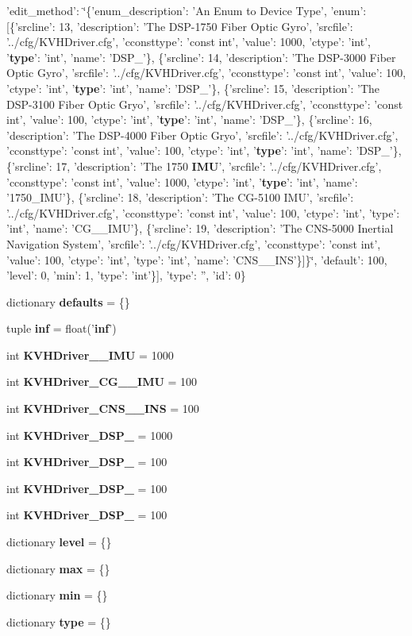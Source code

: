 \begin{DoxyCompactItemize}
'edit\-\_\-method'\-: \char`\"{}\{'enum\-\_\-description'\-: '\-An \-Enum to \-Device \-Type', 'enum'\-: [\{'srcline'\-: 13, 'description'\-: '\-The \-D\-S\-P-\/1750 \-Fiber \-Optic \-Gyro', 'srcfile'\-: '../cfg/\-K\-V\-H\-Driver.\-cfg', 'cconsttype'\-: 'const int', 'value'\-: 1000, 'ctype'\-: 'int', '{\bf type}'\-: 'int', 'name'\-: '\-D\-S\-P\-\_'\}, \{'srcline'\-: 14, 'description'\-: '\-The \-D\-S\-P-\/3000 \-Fiber \-Optic \-Gyro', 'srcfile'\-: '../cfg/\-K\-V\-H\-Driver.\-cfg', 'cconsttype'\-: 'const int', 'value'\-: 100, 'ctype'\-: 'int', '{\bf type}'\-: 'int', 'name'\-: '\-D\-S\-P\-\_'\}, \{'srcline'\-: 15, 'description'\-: '\-The \-D\-S\-P-\/3100 \-Fiber \-Optic \-Gryo', 'srcfile'\-: '../cfg/\-K\-V\-H\-Driver.\-cfg', 'cconsttype'\-: 'const int', 'value'\-: 100, 'ctype'\-: 'int', '{\bf type}'\-: 'int', 'name'\-: '\-D\-S\-P\-\_'\}, \{'srcline'\-: 16, 'description'\-: '\-The \-D\-S\-P-\/4000 \-Fiber \-Optic \-Gryo', 'srcfile'\-: '../cfg/\-K\-V\-H\-Driver.\-cfg', 'cconsttype'\-: 'const int', 'value'\-: 100, 'ctype'\-: 'int', '{\bf type}'\-: 'int', 'name'\-: '\-D\-S\-P\-\_'\}, \{'srcline'\-: 17, 'description'\-: '\-The 1750 {\bf \-I\-M\-U}', 'srcfile'\-: '../cfg/\-K\-V\-H\-Driver.\-cfg', 'cconsttype'\-: 'const int', 'value'\-: 1000, 'ctype'\-: 'int', '{\bf type}'\-: 'int', 'name'\-: '1750\-\_\-\-I\-M\-U'\}, \{'srcline'\-: 18, 'description'\-: '\-The C\-G-\/5100 I\-M\-U', 'srcfile'\-: '../cfg/\-K\-V\-H\-Driver.\-cfg', 'cconsttype'\-: 'const int', 'value'\-: 100, 'ctype'\-: 'int', 'type'\-: 'int', 'name'\-: '\-C\-G\-\_\-\_\-\-I\-M\-U'\}, \{'srcline'\-: 19, 'description'\-: '\-The C\-N\-S-\/5000 Inertial Navigation System', 'srcfile'\-: '../cfg/\-K\-V\-H\-Driver.\-cfg', 'cconsttype'\-: 'const int', 'value'\-: 100, 'ctype'\-: 'int', 'type'\-: 'int', 'name'\-: '\-C\-N\-S\-\_\-\_\-\-I\-N\-S'\}]\}\char`\"{}, 'default'\-: 100, 'level'\-: 0, 'min'\-: 1, 'type'\-: 'int'\}], 'type'\-: '', 'id'\-: 0\}
\item 
dictionary {\bf defaults} = \{\}
\item 
tuple {\bf inf} = float('{\bf inf}')
\item 
int {\bf \-K\-V\-H\-Driver\-\_\-\_\-\-I\-M\-U} = 1000
\item 
int {\bf \-K\-V\-H\-Driver\-\_\-\-C\-G\-\_\-\_\-\-I\-M\-U} = 100
\item 
int {\bf \-K\-V\-H\-Driver\-\_\-\-C\-N\-S\-\_\-\_\-\-I\-N\-S} = 100
\item 
int {\bf \-K\-V\-H\-Driver\-\_\-\-D\-S\-P\-\_} = 1000
\item 
int {\bf \-K\-V\-H\-Driver\-\_\-\-D\-S\-P\-\_} = 100
\item 
int {\bf \-K\-V\-H\-Driver\-\_\-\-D\-S\-P\-\_} = 100
\item 
int {\bf \-K\-V\-H\-Driver\-\_\-\-D\-S\-P\-\_} = 100
\item 
dictionary {\bf level} = \{\}
\item 
dictionary {\bf max} = \{\}
\item 
dictionary {\bf min} = \{\}
\item 
dictionary {\bf type} = \{\}
\end{DoxyCompactItemize}


